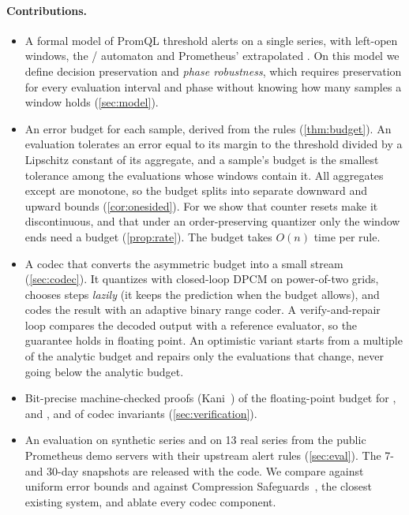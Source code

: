\paragraph{Contributions.}
\begin{itemize}
  \item A formal model of PromQL threshold alerts on a single series, with
    left-open windows, the / automaton
    and Prometheus' extrapolated . On this model we define
    decision preservation and \emph{phase robustness}, which requires
    preservation for every evaluation interval and phase without knowing
    how many samples a window holds (\cref{sec:model}).
  \item An error budget for each sample, derived from the rules
    (\cref{thm:budget}). An evaluation tolerates an error equal to its
    margin to the threshold divided by a Lipschitz constant of its
    aggregate, and a sample's budget is the smallest tolerance among the
    evaluations whose windows contain it. All aggregates except
     are monotone, so the budget splits into separate downward
    and upward bounds (\cref{cor:onesided}). For  we show that
    counter resets make it discontinuous, and that under an
    order-preserving quantizer only the window ends need a budget
    (\cref{prop:rate}). The budget takes $O(n)$ time per rule.
  \item A codec that converts the asymmetric budget into a small stream
    (\cref{sec:codec}). It quantizes with closed-loop DPCM on power-of-two
    grids, chooses steps \emph{lazily} (it keeps the prediction when the
    budget allows), and codes the result with an adaptive binary range
    coder. A verify-and-repair loop compares the decoded output with a
    reference evaluator, so the guarantee holds in floating point. An
    optimistic variant starts from a multiple of the analytic budget and
    repairs only the evaluations that change, never going below the
    analytic budget.
  \item Bit-precise machine-checked proofs (Kani~\cite{vanhattum2022kani})
    of the floating-point budget for , 
    and , and of codec invariants
    (\cref{sec:verification}).
  \item An evaluation on synthetic series and on 13 real series from the
    public Prometheus demo servers with their upstream alert rules
    (\cref{sec:eval}). The 7- and 30-day snapshots are released with the
    code. We compare against uniform error bounds and against Compression
    Safeguards~\cite{tyree2026safeguards}, the closest existing system,
    and ablate every codec component.
\end{itemize}

